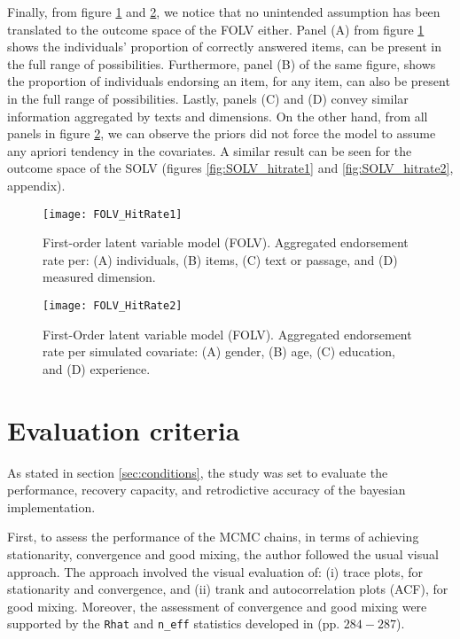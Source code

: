 Finally, from figure \ref{fig:FOLV_hitrate1} and \ref{fig:FOLV_hitrate2}, we notice that no unintended assumption has been translated to the outcome space of the FOLV either. Panel (A) from figure \ref{fig:FOLV_hitrate1} shows the individuals'  proportion of correctly answered items, can be present in the full range of possibilities. Furthermore, panel (B) of the same figure, shows the proportion of individuals endorsing an item, for any item, can also be present in the full range of possibilities. Lastly, panels (C) and (D) convey similar information aggregated by texts and dimensions. On the other hand, from all panels in figure \ref{fig:FOLV_hitrate2}, we can observe the priors did not force the model to assume any apriori tendency in the covariates. A similar result can be seen for the outcome space of the SOLV (figures \ref{fig:SOLV_hitrate1} and \ref{fig:SOLV_hitrate2}, appendix).
%
\begin{figure}[h]
	\centering
	\texttt{[image: FOLV\_HitRate1]}
	\caption[First-order latent variable model (FOLV). Hit rate per dimensions of interest.]%
	{First-order latent variable model (FOLV). Aggregated endorsement rate per: (A) individuals, (B) items, (C) text or passage, and (D) measured dimension.}
	\label{fig:FOLV_hitrate1}
\end{figure}
%
\begin{figure}[h]
	\centering
	\texttt{[image: FOLV\_HitRate2]}
	\caption[First-Order latent variable model (FOLV). Hit rate per simulated covariate.]%
	{First-Order latent variable model (FOLV). Aggregated endorsement rate per simulated covariate: (A) gender, (B) age, (C) education, and (D) experience.}
	\label{fig:FOLV_hitrate2}
\end{figure}


\section{Evaluation criteria}

As stated in section \ref{sec:conditions}, the study was set to evaluate the performance, recovery capacity, and retrodictive accuracy of the bayesian implementation.

First, to assess the performance of the MCMC chains, in terms of achieving stationarity, convergence and good mixing, the author followed the usual visual approach. The approach involved the visual evaluation of: (i) trace plots, for stationarity and convergence, and (ii) trank and autocorrelation plots (ACF), for good mixing. Moreover, the assessment of convergence and good mixing were supported by the \texttt{Rhat} and \texttt{n\_eff} statistics developed in \citet{Gelman_et_al_2014} (pp. $284-287$).

